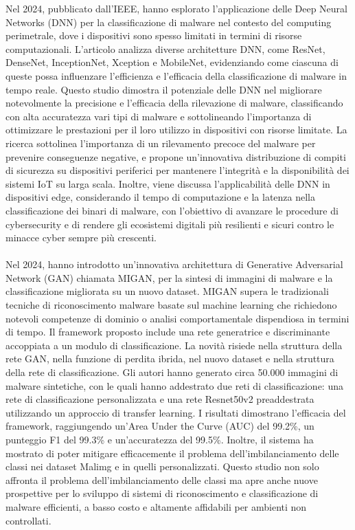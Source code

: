 Nel 2024, pubblicato dall'IEEE, \cite{article:DeepLearningForCyberthreats} hanno esplorato l'applicazione delle Deep Neural Networks (DNN) per la classificazione di malware nel contesto del computing perimetrale, dove i dispositivi sono spesso limitati in termini di risorse computazionali. L'articolo analizza diverse architetture DNN, come ResNet, DenseNet, InceptionNet, Xception e MobileNet, evidenziando come ciascuna di queste possa influenzare l'efficienza e l'efficacia della classificazione di malware in tempo reale. Questo studio dimostra il potenziale delle DNN nel migliorare notevolmente la precisione e l'efficacia della rilevazione di malware, classificando con alta accuratezza vari tipi di malware e sottolineando l'importanza di ottimizzare le prestazioni per il loro utilizzo in dispositivi con risorse limitate. La ricerca sottolinea l'importanza di un rilevamento precoce del malware per prevenire conseguenze negative, e propone un'innovativa distribuzione di compiti di sicurezza su dispositivi periferici per mantenere l'integrità e la disponibilità dei sistemi IoT su larga scala. Inoltre, viene discussa l'applicabilità delle DNN in dispositivi edge, considerando il tempo di computazione e la latenza nella classificazione dei binari di malware, con l'obiettivo di avanzare le procedure di cybersecurity e di rendere gli ecosistemi digitali più resilienti e sicuri contro le minacce cyber sempre più crescenti.\\\\
Nel 2024, \cite{article:ExpertSystems} hanno introdotto un'innovativa architettura di Generative Adversarial Network (GAN) chiamata MIGAN, per la sintesi di immagini di malware e la classificazione migliorata su un nuovo dataset. MIGAN supera le tradizionali tecniche di riconoscimento malware basate sul machine learning che richiedono notevoli competenze di dominio o analisi comportamentale dispendiosa in termini di tempo. Il framework proposto include una rete generatrice e discriminante accoppiata a un modulo di classificazione. La novità risiede nella struttura della rete GAN, nella funzione di perdita ibrida, nel nuovo dataset e nella struttura della rete di classificazione. Gli autori hanno generato circa 50.000 immagini di malware sintetiche, con le quali hanno addestrato due reti di classificazione: una rete di classificazione personalizzata e una rete Resnet50v2 preaddestrata utilizzando un approccio di transfer learning. I risultati dimostrano l'efficacia del framework, raggiungendo un'Area Under the Curve (AUC) del 99.2\%, un punteggio F1 del 99.3\% e un'accuratezza del 99.5\%. Inoltre, il sistema ha mostrato di poter mitigare efficacemente il problema dell'imbilanciamento delle classi nei dataset Malimg e in quelli personalizzati. Questo studio non solo affronta il problema dell'imbilanciamento delle classi ma apre anche nuove prospettive per lo sviluppo di sistemi di riconoscimento e classificazione di malware efficienti, a basso costo e altamente affidabili per ambienti non controllati.\\\\